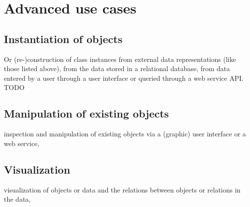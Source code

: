 \section{Advanced use cases}


\subsection{Instantiation of objects}

Or (re-)construction of class instances
from external data representations (like those listed above),
from the data stored in a relational database, from data entered by
a user through a user interface or queried through a web service API.
TODO

\subsection{Manipulation of existing objects}
inspection and manipulation of existing objects via a (graphic) user interface
or a web service,

\subsection{Visualization}

visualization of objects or data and the relations between objects or
relations in the data,









